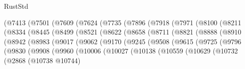 \begin{lexlean}{RustStd}
\begin{coremodule}
{{{{{{{{{{{{{{{{{{{              (@7413
                (@7501
                  (@7609
                    (@7624
                      (@7735
                        (@7896
                          (@7918
                            (@7971
                              (@8100
                                (@8211
                                  (@8334
                                    (@8445
                                      (@8499
                                        (@8521
                                          (@8622
                                            (@8658
                                              (@8711
                                                (@8821
                                                  (@8888
                                                    (@8910
                                                      (@8942
                                                        (@8983
                                                          (@9017
                                                            (@9062
                                                              (@9170
                                                                (@9245
                                                                  (@9508
                                                                    (@9615
                                                                      (@9725
                                                                        (@9796
                                                                          (@9830
                                                                            (@9908
                                                                              (@9960
                                                                                (@10006
                                                                                  (@10027
                                                                                    (@10138
                                                                                      (@10559
                                                                                        (@10629
                                                                                          (@10732
                                                                                            (@2868
                                                                                              (@10738
                                                                                                @10744)
}}}}}}}}}}}}}}}}}}}
\end{coremodule}
\end{lexlean}
